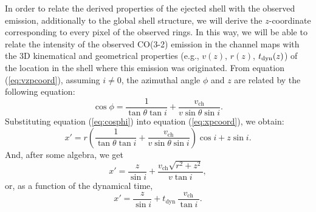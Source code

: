 \documentclass[12pt]{mythesis}
\begin{document}


In order to relate the derived properties of the ejected shell with the observed emission, additionally to the global shell structure, we will derive the $z$-coordinate corresponding to every pixel of the observed rings. In this way, we will be able to relate the intensity of the observed CO(3-2) emission in the channel maps with the 3D kinematical and geometrical properties (e.g., $v(z)$, $r(z)$, $t_{\rm dyn}(z)$) of the location in the shell where this emission was originated. From equation (\ref{eq:vzpcoord}), assuming $i\neq0$, the azimuthal angle $\phi$ and $z$ are related by the following equation:
 \begin{equation}\label{eq:cosphi}
 \cos\phi = \frac{1}{\tan\theta\tan i} + \frac{v_\mathrm{ch}}{v\sin\theta\sin i}.
\end{equation}
Substituting equation (\ref{eq:cosphi}) into equation (\ref{eq:xpcoord}), we obtain:
\begin{equation}
x' = r \left(\frac{1}{\tan\theta\tan i}+\frac{v_\mathrm{ch}}{v\sin\theta\sin i} \right)\cos i + z \sin i.
\end{equation}
And, after some algebra, we get
\begin{equation}
	x'= \frac{z}{\sin i} + \frac{v_\mathrm{ch} \sqrt{r^2+z^2}}{v \tan i},
\end{equation}
or, as a function of the dynamical time,
\begin{equation}\label{eq:xpdprj}
	x'=\frac{z}{\sin i } + t_\mathrm{dyn}\,\frac{v_\mathrm{ch}}{\tan i \,}.
\end{equation}
\end{document}
